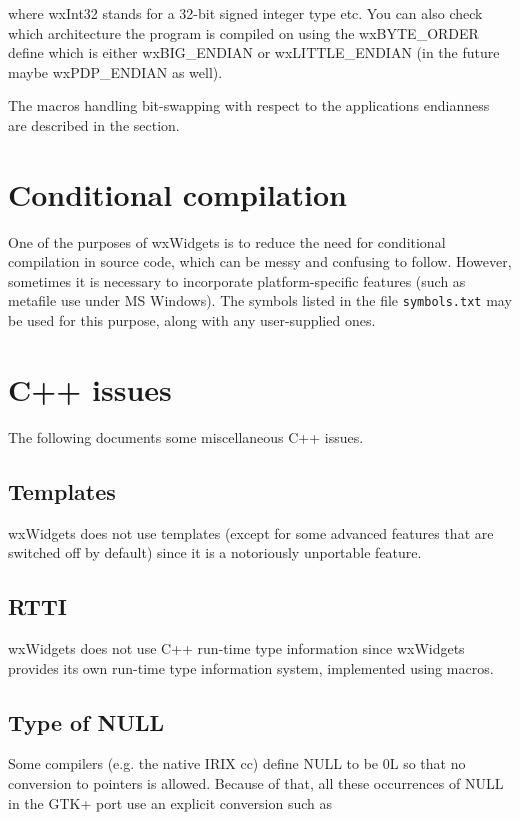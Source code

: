 where wxInt32 stands for a 32-bit signed integer type etc. You can also check
which architecture the program is compiled on using the wxBYTE\_ORDER define
which is either wxBIG\_ENDIAN or wxLITTLE\_ENDIAN (in the future maybe wxPDP\_ENDIAN
as well).

The macros handling bit-swapping with respect to the applications endianness
are described in the  section.

\section{Conditional compilation}\label{conditionalcompilation}

One of the purposes of wxWidgets is to reduce the need for conditional
compilation in source code, which can be messy and confusing to follow.
However, sometimes it is necessary to incorporate platform-specific
features (such as metafile use under MS Windows). The symbols
listed in the file {\tt symbols.txt} may be used for this purpose,
along with any user-supplied ones.

\section{C++ issues}\label{cpp}

The following documents some miscellaneous C++ issues.

\subsection{Templates}\label{templates}

wxWidgets does not use templates (except for some advanced features that
are switched off by default) since it is a notoriously unportable feature.

\subsection{RTTI}\label{rtti}

wxWidgets does not use C++ run-time type information since wxWidgets provides
its own run-time type information system, implemented using macros.

\subsection{Type of NULL}\label{null}

Some compilers (e.g. the native IRIX cc) define NULL to be 0L so that
no conversion to pointers is allowed. Because of that, all these
occurrences of NULL in the GTK+ port use an explicit conversion such 
as

